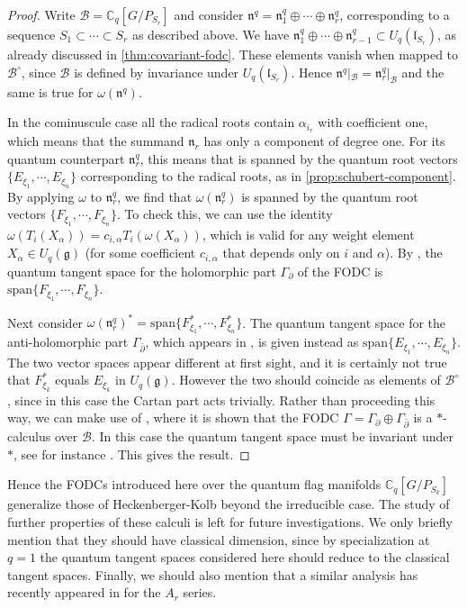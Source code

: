 \documentclass[a4paper, 12pt, reqno, english]{amsart}
\numberwithin{equation}{section}
\numberwithin{figure}{section}
\theoremstyle{plain}
\theoremstyle{plain}
\theoremstyle{plain}
\theoremstyle{plain}
\theoremstyle{plain}
\theoremstyle{definition}
\theoremstyle{definition}
\theoremstyle{definition}
\theoremstyle{remark}
\theoremstyle{definition}
\theoremstyle{definition}
\newcommand{\Uqg}{U_q(\mathfrak{g})}
\newcommand{\bbC}{\mathbb{C}}
\newcommand{\liel}{\mathfrak{l}}
\newcommand{\lien}{\mathfrak{n}}
\newcommand{\calB}{\mathcal{B}}
\newcommand{\lspan}{\mathrm{span}}
\newcommand{\qnil}{\lien^q}
\newcommand{\del}{\partial}
\newcommand{\delbar}{\bar{\partial}}
\begin{document}
\begin{proof}
Write $\calB = \bbC_q[G / P_{S_r}]$ and consider $\qnil = \qnil_1 \oplus \cdots \oplus \qnil_r$, corresponding to a sequence $S_1 \subset \cdots \subset S_r$ as described above.
We have $\qnil_1 \oplus \cdots \oplus \qnil_{r - 1} \subset U_q(\liel_{S_r})$, as already discussed in \cref{thm:covariant-fodc}. These elements vanish when mapped to $\calB^\circ$, since $\calB$ is defined by invariance under $U_q(\liel_{S_r})$. Hence $\qnil |_\calB = \qnil_r |_\calB$ and the same is true for $\omega(\qnil)$.

In the cominuscule case all the radical roots contain $\alpha_{i_r}$ with coefficient one, which means that the summand $\lien_r$ has only a component of degree one.
For its quantum counterpart $\qnil_r$, this means that is spanned by the quantum root vectors $\{ E_{\xi_1}, \cdots, E_{\xi_n} \}$ corresponding to the radical roots, as in \cref{prop:schubert-component}.
By applying $\omega$ to $\qnil_r$, we find that $\omega(\qnil_r)$ is spanned by the quantum root vectors $\{ F_{\xi_1}, \cdots, F_{\xi_n} \}$.
To check this, we can use the identity $\omega(T_i(X_\alpha)) = c_{i, \alpha} T_i(\omega(X_\alpha))$, which is valid for any weight element $X_\alpha \in \Uqg$ (for some coefficient $c_{i, \alpha}$ that depends only on $i$ and $\alpha$).
By \cite[Proposition 3.3(v)]{heko}, the quantum tangent space for the holomorphic part $\Gamma_\del$ of the FODC is $\lspan \{ F_{\xi_1}, \cdots, F_{\xi_n} \}$.

Next consider $\omega(\qnil_r)^* = \lspan \{ F_{\xi_1}^*, \cdots, F_{\xi_n}^* \}$.
The quantum tangent space for the anti-holomorphic part $\Gamma_{\delbar}$, which appears in \cite[Proposition 3.4(v)]{heko}, is given instead as $\lspan \{ E_{\xi_1}, \cdots, E_{\xi_n} \}$.
The two vector spaces appear different at first sight, and it is certainly not true that $F_{\xi_k}^*$ equals $E_{\xi_k}$ in $\Uqg$. However the two should coincide as elements of $\calB^\circ$, since in this case the Cartan part acts trivially.
Rather than proceeding this way, we can make use of \cite[Theorem 4.2]{kahler}, where it is shown that the FODC $\Gamma = \Gamma_\del \oplus \Gamma_{\delbar}$ is a $*$-calculus over $\calB$.
In this case the quantum tangent space must be invariant under $*$, see for instance \cite[Section 14.1.2, Proposition 6]{klsc}.
This gives the result.
\end{proof}

Hence the FODCs introduced here over the quantum flag manifolds $\bbC_q[G / P_{S_k}]$ generalize those of Heckenberger-Kolb beyond the irreducible case.
The study of further properties of these calculi is left for future investigations.
We only briefly mention that they should have classical dimension, since by specialization at $q = 1$ the quantum tangent spaces considered here should reduce to the classical tangent spaces.
Finally, we should also mention that a similar analysis has recently appeared in \cite{reamonn-ar} for the $A_r$ series.
\end{document}

